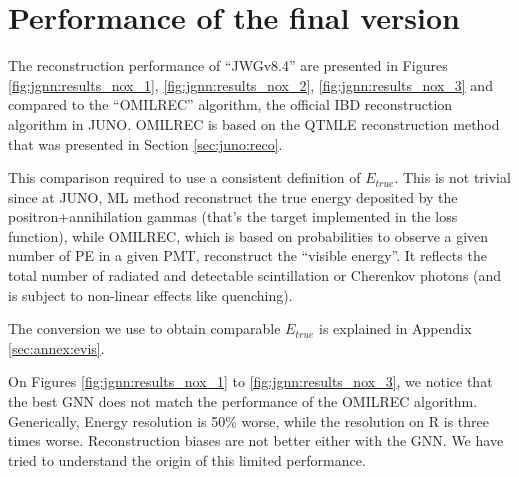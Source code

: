 \documentclass[../main.tex]{subfiles}
\begin{document}
\section{Performance of the final version}
\label{sec:jgnn:results}


The reconstruction performance of ``JWGv8.4'' are presented in Figures \ref{fig:jgnn:results_nox_1}, \ref{fig:jgnn:results_nox_2}, \ref{fig:jgnn:results_nox_3} and compared to the ``OMILREC'' algorithm, the official IBD reconstruction algorithm in JUNO. OMILREC is based on the QTMLE reconstruction method that was presented in Section \ref{sec:juno:reco}.

This comparison required to use a consistent definition of $E_{true}$. This is not trivial since at JUNO, ML method reconstruct the true energy deposited by the positron+annihilation gammas (that's the target implemented in the loss function), while OMILREC, which is based on probabilities to observe a given number of PE in a given PMT, reconstruct the ``visible energy''. It reflects the total number of radiated and detectable scintillation or Cherenkov photons (and is subject to non-linear effects like quenching).

The conversion we use to obtain comparable $E_{true}$ is explained in Appendix \ref{sec:annex:evis}.

On Figures \ref{fig:jgnn:results_nox_1} to \ref{fig:jgnn:results_nox_3}, we notice that the best GNN does not match the performance of the OMILREC algorithm. Generically, Energy resolution is 50\% worse, while the resolution on R is three times worse. Reconstruction biases are not better either with the GNN. We have tried to understand the origin of this limited performance.


%
\end{document}
